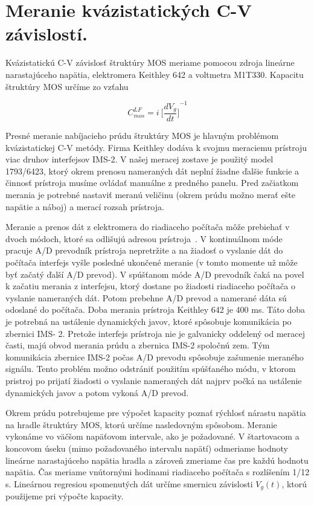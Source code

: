 \section{Meranie kvázistatických C-V závislostí.}\label{sec:5.2}

Kvázistatickú C-V závislosť štruktúry MOS meriame pomocou zdroja
lineárne narastajúceho napätia, elektromera Keithley 642 a voltmetra
M1T330. Kapacitu štruktúry MOS určíme zo vzťahu

\begin{equation}\label{eq:5.1}
  C_{mos}^{LF} = i\ {\bigg[\frac{dV_{g}}{dt}\bigg]}^{-1}
\end{equation}

Presné meranie nabíjacieho prúdu štruktúry MOS je hlavným problémom
kvázistatickej C-V metódy. Firma Keithley dodáva k svojmu meraciemu
prístroju viac druhov interfejsov IMS-2. V našej meracej zostave je
použitý model 1793/6423, ktorý okrem prenosu nameraných dát neplní
žiadne ďalšie funkcie a činnosť prístroja musíme ovládať manuálne z
predného panelu.  Pred začiatkom merania je potrebné nastaviť meranú
veličinu (okrem prúdu možno merať ešte napätie a náboj) a merací
rozsah prístroja.

Meranie a prenos dát z elektromera do riadiaceho počítača môže
prebiehať v dvoch módoch, ktoré sa odlišujú adresou
prístroja~\cite{5.3}. V kontinuálnom móde pracuje A/D prevodník
prístroja nepretržite a na žiadosť o vyslanie dát do počítača
interfejs vyšle posledné ukončené meranie (v tomto momente už môže byť
začatý ďalší A/D prevod). V spúšťanom móde A/D prevodník čaká na povel
k začatiu merania z interfejsu, ktorý dostane po žiadosti riadiaceho
počítača o vyslanie nameraných dát. Potom prebehne A/D prevod a
namerané dáta sú odoslané do počítača. Doba merania prístroja Keithley
642 je 400 ms. Táto doba je potrebná na ustálenie dynamických javov,
ktoré spôsobuje komunikácia po zbernici IMS- 2. Pretože interfejs
prístroja nie je galvanicky oddelený od meracej časti, majú obvod
merania prúdu a zbernica IMS-2 spoločnú zem. Tým komunikácia zbernice
IMS-2 počas A/D prevodu spôsobuje zašumenie meraného signálu.  Tento
problém možno odstrániť použitím spúšťaného módu, v ktorom pristroj po
prijatí žiadosti o vyslanie nameraných dát najprv počká na ustálenie
dynamických javov a potom vykoná A/D prevod.

Okrem prúdu potrebujeme pre výpočet kapacity poznať rýchlosť nárastu
napätia na hradle štruktúry MOS, ktorú určíme nasledovným spôsobom.
Meranie vykonáme vo väčšom napäťovom intervale, ako je požadované. V
štartovacom a koncovom úseku (mimo požadovaného intervalu napätí)
odmeriame hodnoty lineárne narastajúceho napätia hradla a zároveň
zmeriame čas pre každú hodnotu napätia. Čas meriame vnútornými
hodinami riadiaceho počítača s rozlíšením 1/12 s. Lineárnou regresiou
spomenutých dát určíme smernicu závislosti $V_{g}(t)$, ktorú použijeme
pri výpočte kapacity.


